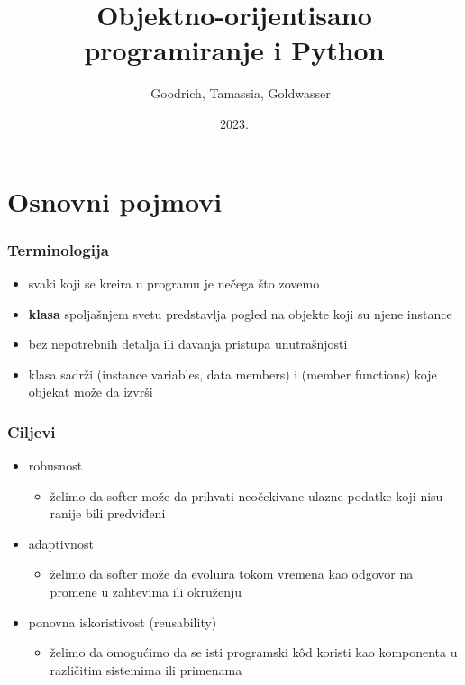 \documentclass[compress,aspectratio=169]{beamer}
\title{Objektno-orijentisano programiranje i Python}
\author{\textcopyright \ \ Goodrich, Tamassia, Goldwasser}
\institute{Katedra za informatiku, Fakultet tehničkih nauka, Univerzitet u
Novom Sadu}
\date{2023.}
\begin{document}
\frame{\titlepage}

\section[Osnovni pojmovi]{Osnovni pojmovi}
\begin{frame}[fragile]
  \frametitle{Terminologija}
  \begin{itemize}
    \item svaki  koji se kreira u programu je  nečega što zovemo 
    \item \textbf{klasa} spoljašnjem svetu predstavlja pogled na objekte koji su njene instance
    \item bez nepotrebnih detalja ili davanja pristupa unutrašnjosti
    \item klasa sadrži  (instance variables, data members) i  (member functions) koje objekat može da izvrši 
  \end{itemize}
\end{frame}

\begin{frame}[fragile]
  \frametitle{Ciljevi}
  \begin{itemize}
    \item robusnost
    \begin{itemize}
      \item želimo da softer može da prihvati neočekivane ulazne podatke koji nisu ranije bili predviđeni
    \end{itemize}
    \item adaptivnost
    \begin{itemize}
      \item želimo da softer može da evoluira tokom vremena kao odgovor na promene u zahtevima ili okruženju
    \end{itemize}
    \item ponovna iskoristivost (reusability)
    \begin{itemize}
      \item želimo da omogućimo da se isti programski kôd koristi kao komponenta u različitim sistemima ili primenama
    \end{itemize}
  \end{itemize}
\end{frame}
\end{document}
